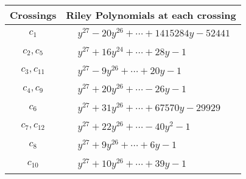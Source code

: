 \documentclass[1p]{elsarticle_modified}
\theoremstyle{definition}
\begin{document}
\begin{tabular}{m{50pt}|m{274pt}}
Crossings & \hspace{64pt}Riley Polynomials at each crossing \\
\hline $$\begin{aligned}c_{1}\end{aligned}$$&$\begin{aligned}
&y^{27}-20 y^{26}+\cdots+1415284 y-52441
\end{aligned}$\\
\hline $$\begin{aligned}c_{2},c_{5}\end{aligned}$$&$\begin{aligned}
&y^{27}+16 y^{24}+\cdots+28 y-1
\end{aligned}$\\
\hline $$\begin{aligned}c_{3},c_{11}\end{aligned}$$&$\begin{aligned}
&y^{27}-9 y^{26}+\cdots+20 y-1
\end{aligned}$\\
\hline $$\begin{aligned}c_{4},c_{9}\end{aligned}$$&$\begin{aligned}
&y^{27}+20 y^{26}+\cdots-26 y-1
\end{aligned}$\\
\hline $$\begin{aligned}c_{6}\end{aligned}$$&$\begin{aligned}
&y^{27}+31 y^{26}+\cdots+67570 y-29929
\end{aligned}$\\
\hline $$\begin{aligned}c_{7},c_{12}\end{aligned}$$&$\begin{aligned}
&y^{27}+22 y^{26}+\cdots-40 y^2-1
\end{aligned}$\\
\hline $$\begin{aligned}c_{8}\end{aligned}$$&$\begin{aligned}
&y^{27}+9 y^{26}+\cdots+6 y-1
\end{aligned}$\\
\hline $$\begin{aligned}c_{10}\end{aligned}$$&$\begin{aligned}
&y^{27}+10 y^{26}+\cdots+39 y-1
\end{aligned}$\\
\hline
\end{tabular}\\~\\
\end{document}
